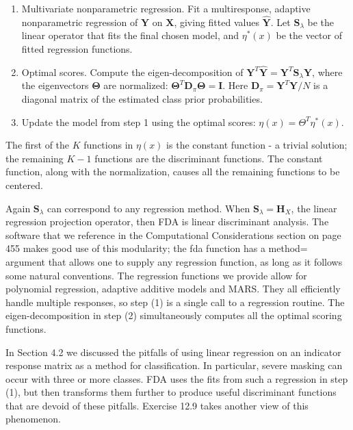 \documentclass[10pt]{article}
\begin{document}
\begin{enumerate}
  \item Multivariate nonparametric regression. Fit a multiresponse, adaptive nonparametric regression of $\mathbf{Y}$ on $\mathbf{X}$, giving fitted values $\hat{\mathbf{Y}}$. Let $\mathbf{S}_{\lambda}$ be the linear operator that fits the final chosen model, and $\eta^{*}(x)$ be the vector of fitted regression functions.
  \item Optimal scores. Compute the eigen-decomposition of $\mathbf{Y}^{T} \hat{\mathbf{Y}}=\mathbf{Y}^{T} \mathbf{S}_{\lambda} \mathbf{Y}$, where the eigenvectors $\boldsymbol{\Theta}$ are normalized: $\boldsymbol{\Theta}^{T} \mathbf{D}_{\pi} \boldsymbol{\Theta}=\mathbf{I}$. Here $\mathbf{D}_{\pi}= \mathbf{Y}^{T} \mathbf{Y} / N$ is a diagonal matrix of the estimated class prior probabilities.
  \item Update the model from step 1 using the optimal scores: $\eta(x)=\Theta^{T} \eta^{*}(x)$.
\end{enumerate}

The first of the $K$ functions in $\eta(x)$ is the constant function - a trivial solution; the remaining $K-1$ functions are the discriminant functions. The constant function, along with the normalization, causes all the remaining functions to be centered.

Again $\mathbf{S}_{\lambda}$ can correspond to any regression method. When $\mathbf{S}_{\lambda}=\mathbf{H}_{X}$, the linear regression projection operator, then FDA is linear discriminant analysis. The software that we reference in the Computational Considerations section on page 455 makes good use of this modularity; the fda function has a method= argument that allows one to supply any regression function, as long as it follows some natural conventions. The regression functions we provide allow for polynomial regression, adaptive additive models and MARS. They all efficiently handle multiple responses, so step (1) is a single call to a regression routine. The eigen-decomposition in step (2) simultaneously computes all the optimal scoring functions.

In Section 4.2 we discussed the pitfalls of using linear regression on an indicator response matrix as a method for classification. In particular, severe masking can occur with three or more classes. FDA uses the fits from such a regression in step (1), but then transforms them further to produce useful discriminant functions that are devoid of these pitfalls. Exercise 12.9 takes another view of this phenomenon.
\end{document}
